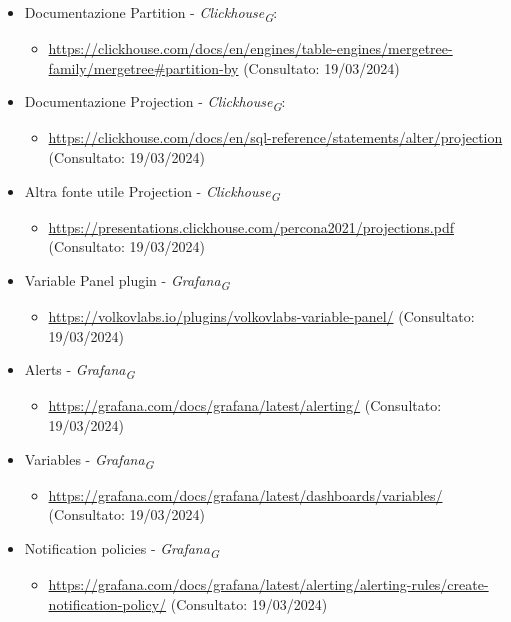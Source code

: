 \begin{itemize}
    \item Documentazione Partition - \textit{Clickhouse}\textsubscript{\textit{G}}: 
    \begin{itemize}
        \item \url{https://clickhouse.com/docs/en/engines/table-engines/mergetree-family/mergetree#partition-by} (Consultato: 19/03/2024)
    \end{itemize}
    \item Documentazione Projection - \textit{Clickhouse}\textsubscript{\textit{G}}: 
    \begin{itemize}
        \item \url{https://clickhouse.com/docs/en/sql-reference/statements/alter/projection} (Consultato: 19/03/2024)
    \end{itemize}
    \item Altra fonte utile Projection - \textit{Clickhouse}\textsubscript{\textit{G}} 
    \begin{itemize}
        \item \url{https://presentations.clickhouse.com/percona2021/projections.pdf} (Consultato: 19/03/2024)
    \end{itemize}
    \item  Variable Panel plugin - \textit{Grafana}\textsubscript{\textit{G}} 
    \begin{itemize}
        \item \url{https://volkovlabs.io/plugins/volkovlabs-variable-panel/} (Consultato: 19/03/2024)
    \end{itemize}
    \item  Alerts - \textit{Grafana}\textsubscript{\textit{G}} 
    \begin{itemize}
        \item \url{https://grafana.com/docs/grafana/latest/alerting/} (Consultato: 19/03/2024)
    \end{itemize}
    \item Variables - \textit{Grafana}\textsubscript{\textit{G}} 
    \begin{itemize}
        \item \url{https://grafana.com/docs/grafana/latest/dashboards/variables/} (Consultato: 19/03/2024)
    \end{itemize}
    \item  Notification policies - \textit{Grafana}\textsubscript{\textit{G}} 
    \begin{itemize}
        \item \url{https://grafana.com/docs/grafana/latest/alerting/alerting-rules/create-notification-policy/} (Consultato: 19/03/2024)

\end{itemize}
\end{itemize}

